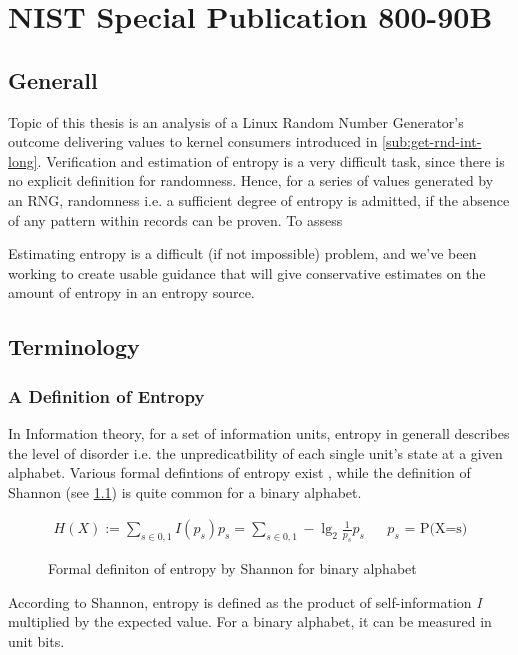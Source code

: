 \chapter{NIST Special Publication 800-90B}
\label{chap:NIST800-90B}
\section{Generall}

Topic of this thesis is an analysis of a Linux Random Number Generator's outcome delivering values to kernel consumers introduced in \ref{sub:get-rnd-int-long}. Verification and estimation of entropy is 
a very difficult task, since there is no explicit definition for randomness. Hence, for a series of values generated by an RNG, randomness i.e. a sufficient degree of entropy is admitted, if the absence of any pattern within records can be proven. 
To assess 

\cite{robert2006dieharder, rukhin2001statistical}



\cite{turan2015random}

Estimating entropy is a difficult (if not impossible) problem, and we've been working to create
usable guidance that will give conservative estimates on the amount of entropy in an entropy
source.
\cite{turan2015random}


\section{Terminology}
\subsection{A Definition of Entropy}
In Information theory, for a set of information units, entropy in generall describes the level of disorder i.e. the unpredicatbility of each single unit's state at a given alphabet. Various formal defintions of entropy exist \cite{hagerty2012entropy}, while the definition of Shannon (see \ref{fig:form-entropy-shan}) is quite common for a binary alphabet. 

\begin{figure}[H]
	\begin{align*}
	\displaystyle H(X) := \sum_{s \in {0,1}} I(p_s) p_s = \sum_{s \in {0,1}} -\lg_2 \frac{1}{p_s} p_s && \text{$p_s$ = P(X=s)}
	\end{align*}
	\caption{Formal definiton of entropy by Shannon for binary alphabet}
	\label{fig:form-entropy-shan}
\end{figure}
According to Shannon, entropy is defined as the product of self-information \textit{I} multiplied by the expected value. For a binary alphabet, it can be measured in unit bits. 
